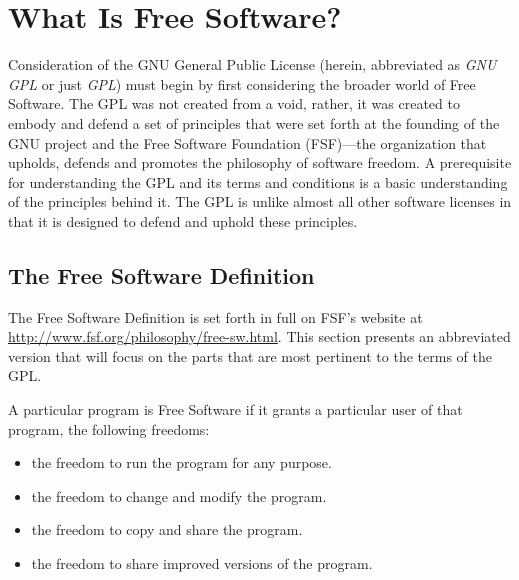\documentclass[12pt]{report}
\newcommand{\defn}[1]{\emph{#1}}
\begin{document}
\tableofcontents

\pagebreak


\chapter{What Is Free Software?}

Consideration of the GNU General Public License (herein, abbreviated as
\defn{GNU GPL} or just \defn{GPL}) must begin by first considering the broader
world of Free Software.  The GPL was not created from a void, rather,
it was created to embody and defend a set of principles that were set
forth at the founding of the GNU project and the Free Software Foundation
(FSF)---the organization that upholds, defends and promotes the philosophy
of software freedom.  A prerequisite for understanding the GPL and its
terms and conditions is a basic understanding of the principles behind it.
The GPL is unlike almost all other software licenses in that it is
designed to defend and uphold these principles.

\section{The Free Software Definition}
\label{Free Software Definition}

The Free Software Definition is set forth in full on FSF's website at
\href{http://www.fsf.org/philosophy/free-sw.html}{http://www.fsf.org/philosophy/free-sw.html}.
This section presents an abbreviated version that will focus on the parts
that are most pertinent to the terms of the GPL\@.

A particular program is Free Software if it grants a particular user of
that program, the following freedoms:

\begin{itemize}

\item the freedom to run the program for any purpose.

\item the freedom to change and modify the program.

\item the freedom to copy and share the program.

\item the freedom to share improved versions of the program.

\end{itemize}
\end{document}
